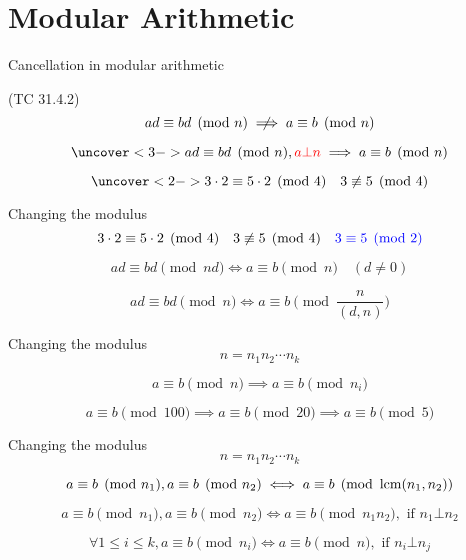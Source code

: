 \section{Modular Arithmetic}

\begin{frame}{Cancellation in modular arithmetic}
  \begin{exampleblock}{(TC 31.4.2)}
	\[
	  ad \equiv bd \pmod{n} \centernot\implies a \equiv b \pmod{n} 
	\]

	\[
	  \uncover<3->{ad \equiv bd \pmod{n}, \textcolor{red}{a \bot n} \implies a \equiv b \pmod{n}}
	\]
  \end{exampleblock}

  \[
	\uncover<2->{3 \cdot 2 \equiv 5 \cdot 2 \pmod{4} \quad 3 \not\equiv 5 \pmod{4}}
  \]
\end{frame}
\begin{frame}{Changing the modulus}
  \[
	3 \cdot 2 \equiv 5 \cdot 2 \pmod{4} \quad 3 \not\equiv 5 \pmod{4}
	\quad \textcolor{blue}{3 \equiv 5 \pmod{2}}
  \]

  \pause
  \[
	ad \equiv bd \pmod{nd} \iff a \equiv b \pmod{n} \quad (d \neq 0)
  \]

  \pause
  \[
	ad \equiv bd \pmod{n} \iff a \equiv b \pmod{\frac{n}{(d,n)}}
  \]
\end{frame}
\begin{frame}{Changing the modulus}
  \[
	n = n_1n_2\cdots n_k
  \]

  \pause
  \[
	a \equiv b \pmod{n} \implies a \equiv b \pmod{n_i}
  \]

  \pause
  \[
	a \equiv b \pmod{100} \implies a \equiv b \pmod{20} \implies a \equiv b \pmod{5}
  \]
\end{frame}
\begin{frame}{Changing the modulus}
  \[
	n = n_1n_2\cdots n_k
  \]

  \pause
  \[
	a \equiv b \pmod{n_1}, a \equiv b \pmod{n_2} \iff a \equiv b \pmod{\operatorname{lcm}(n_1, n_2)}
  \]

  \pause
  \[
	a \equiv b \pmod{n_1}, a \equiv b \pmod{n_2} \iff a \equiv b \pmod{n_1n_2}, \text{ if } n_1 \bot n_2
  \]

  \pause
  \[
	\forall 1 \le i \le k, a \equiv b \pmod{n_i} \iff a \equiv b \pmod{n}, \text{ if } n_i \bot n_j
  \]
\end{frame}
